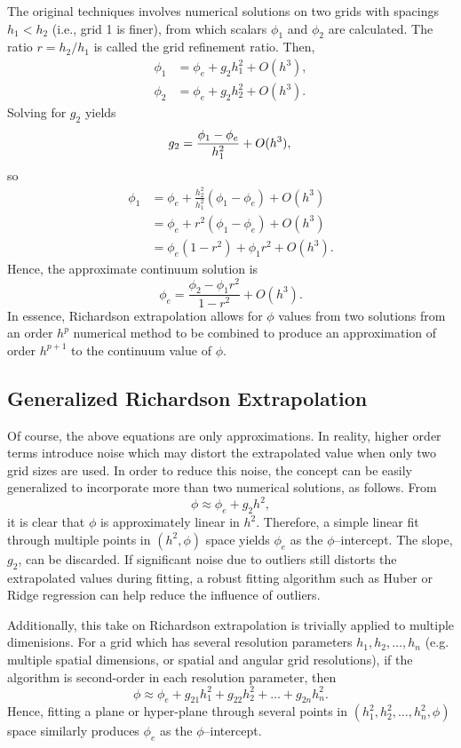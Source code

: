 The original techniques involves numerical solutions on two grids with spacings $h_1 < h_2$ (i.e., grid 1 is finer), from which scalars $\phi_1$ and $\phi_2$ are calculated.
The ratio $r = h_2/h_1$ is called the grid refinement ratio.
Then,
\begin{align*}
  \phi_1 &= \phi_e + g_2 h_1^2 + O(h^3), \\
  \phi_2 &= \phi_e + g_2 h_2^2 + O(h^3).
\end{align*}
Solving for $g_2$ yields
\begin{equation*}
  g_2 = \frac{\phi_1 - \phi_e}{h_1^2} + O(h^3), \\
\end{equation*}
so
\begin{align*}
  \phi_1 &= \phi_e + \frac{h_2^2}{h_1^2}(\phi_1 - \phi_e) + O(h^3) \\
  &=  \phi_e + r^2(\phi_1 - \phi_e) + O(h^3) \\
  &= \phi_e(1-r^2) + \phi_1 r^2 + O(h^3).
\end{align*}
Hence, the approximate continuum solution is
\begin{equation*}
  \phi_e = \frac{\phi_2 - \phi_1 r^2}{1 - r^2} + O(h^3).
\end{equation*}
In essence, Richardson extrapolation allows for $\phi$ values from two solutions from an order $h^p$ numerical method to be combined to produce an approximation of order $h^{p+1}$ to the continuum value of $\phi$.

\subsection{Generalized Richardson Extrapolation}
Of course, the above equations are only approximations.
In reality, higher order terms introduce noise which may distort the extrapolated value
when only two grid sizes are used.
In order to reduce this noise, the concept can be easily generalized to incorporate more than two numerical solutions, as follows.
From
\begin{equation*}
  \phi \approx \phi_e + g_2 h^2,
\end{equation*}
it is clear that $\phi$ is approximately linear in $h^2$.
Therefore, a simple linear fit through multiple points in $(h^2, \phi)$ space yields $\phi_e$ as the $\phi$--intercept.
The slope, $g_2$, can be discarded.
If significant noise due to outliers still distorts the extrapolated values during fitting, a robust fitting algorithm such as Huber \cite{yu_robust_2014} or Ridge \cite{hoerl_ridge_1970} regression can help reduce the influence of outliers.

Additionally, this take on Richardson extrapolation is trivially applied to multiple dimenisions.
For a grid which has several resolution parameters $h_1, h_2, \ldots, h_n$ (e.g. multiple spatial dimensions, or spatial and angular grid resolutions), if the algorithm is second-order in each resolution parameter, then
\begin{equation*}
  \phi \approx \phi_e + g_{21} h_1^2 + g_{22} h_2^2 + \ldots + g_{2n} h_n^2.
\end{equation*}
Hence, fitting a plane or hyper-plane through several points in $(h_1^2, h_2^2, \ldots, h_n^2, \phi)$ space similarly produces $\phi_e$ as the $\phi$--intercept.
